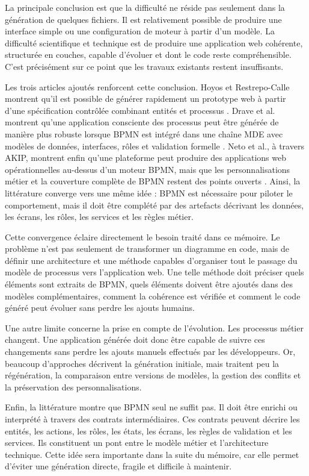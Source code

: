 La principale conclusion est que la difficulté ne réside pas seulement
dans la génération de quelques fichiers. Il est relativement possible de
produire une interface simple ou une configuration de moteur à partir
d'un modèle. La difficulté scientifique et technique est de produire une
application web cohérente, structurée en couches, capable d'évoluer et
dont le code reste compréhensible. C'est précisément sur ce point que
les travaux existants restent insuffisants.

Les trois articles ajoutés renforcent cette conclusion. Hoyos et
Restrepo-Calle montrent qu'il est possible de générer rapidement un
prototype web à partir d'une spécification contrôlée combinant entités
et processus \cite{hoyos2017}. Drave et al. montrent qu'une application
consciente des processus peut être générée de manière plus robuste
lorsque BPMN est intégré dans une chaîne MDE avec modèles de données,
interfaces, rôles et validation formelle \cite{drave2022}. Neto et al., à
travers AKIP, montrent enfin qu'une plateforme peut produire des
applications web opérationnelles au-dessus d'un moteur BPMN, mais que
les personnalisations métier et la couverture complète de BPMN restent
des points ouverts \cite{neto2022}. Ainsi, la littérature converge vers une
même idée : BPMN est nécessaire pour piloter le comportement, mais il
doit être complété par des artefacts décrivant les données, les écrans,
les rôles, les services et les règles métier.

Cette convergence éclaire directement le besoin traité dans ce mémoire.
Le problème n'est pas seulement de transformer un diagramme en code,
mais de définir une architecture et une méthode capables d'organiser
tout le passage du modèle de processus vers l'application web. Une telle
méthode doit préciser quels éléments sont extraits de BPMN, quels
éléments doivent être ajoutés dans des modèles complémentaires, comment
la cohérence est vérifiée et comment le code généré peut évoluer sans
perdre les ajouts humains.

Une autre limite concerne la prise en compte de l'évolution. Les
processus métier changent. Une application générée doit donc être
capable de suivre ces changements sans perdre les ajouts manuels
effectués par les développeurs. Or, beaucoup d'approches décrivent la
génération initiale, mais traitent peu la régénération, la comparaison
entre versions de modèles, la gestion des conflits et la préservation
des personnalisations.

Enfin, la littérature montre que BPMN seul ne suffit pas. Il doit être
enrichi ou interprété à travers des contrats intermédiaires. Ces
contrats peuvent décrire les entités, les actions, les rôles, les états,
les écrans, les règles de validation et les services. Ils constituent un
pont entre le modèle métier et l'architecture technique. Cette idée sera
importante dans la suite du mémoire, car elle permet d'éviter une
génération directe, fragile et difficile à maintenir.

